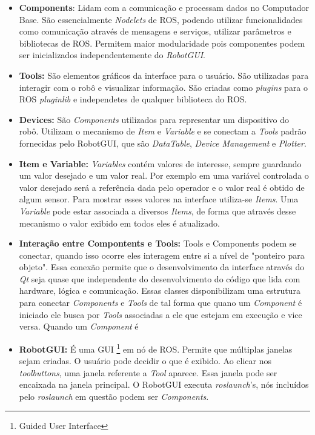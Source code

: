 \begin{itemize}
\item \textbf{Components}: Lidam com a comunicação e processam dados no Computador Base. São essencialmente \textit{Nodelets} de ROS, podendo utilizar funcionalidades como comunicação através de mensagens e serviços, utilizar parâmetros e bibliotecas de ROS. Permitem maior modularidade pois componentes podem ser inicializados independentemente do \textit{RobotGUI}.

\item \textbf{Tools:} São elementos gráficos da interface para o usuário. São utilizadas para interagir com o robô e visualizar informação. São criadas como \textit{plugins} para o ROS \textit{pluginlib} e independetes de qualquer biblioteca do ROS.

\item \textbf{Devices:} São \textit{Components} utilizados para representar um dispositivo do robô. Utilizam o mecanismo de \textit{Item} e \textit{Variable} e se conectam a \textit{Tools} padrão fornecidas pelo RobotGUI, que são \textit{DataTable}, \textit{Device Management} e \textit{Plotter}. 

\item \textbf{Item e Variable:} \textit{Variables} contém valores de interesse, sempre guardando um valor desejado e um valor real. Por exemplo em uma variável controlada o valor desejado será a referência dada pelo operador e o valor real é obtido de algum sensor. Para mostrar esses valores na interface utiliza-se \textit{Items}. Uma \textit{Variable} pode estar associada a diversos \textit{Items}, de forma que através desse mecanismo o valor exibido em todos eles é atualizado. 

\item \textbf{Interação entre Compontents e Tools:} Tools e Components podem se conectar, quando isso ocorre eles interagem entre si a nível de "ponteiro para objeto". Essa conexão permite que o desenvolvimento da interface através do \textit{Qt} seja quase que independente do desenvolvimento do código que lida com hardware, lógica e comunicação. Essas classes disponibilizam uma estrutura para conectar \textit{Components} e \textit{Tools} de tal forma que quano um \textit{Component} é iniciado ele busca por \textit{Tools} associadas a ele que estejam em execução e vice versa. Quando um \textit{Component} é 

\item \textbf{RobotGUI:} É uma GUI \footnote{Guided User Interface} em nó de ROS. Permite que múltiplas janelas sejam criadas. O usuário pode decidir o que é exibido. Ao clicar nos \textit{toolbuttons}, uma janela referente a \textit{Tool} aparece. Essa janela pode ser encaixada na janela principal. O RobotGUI executa \textit{roslaunch}'s, nós incluídos pelo \textit{roslaunch} em questão podem ser \textit{Components}. 


\end{itemize}
